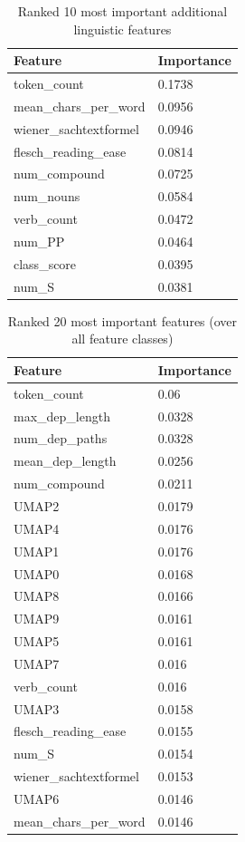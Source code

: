 \documentclass[11pt]{article}
\begin{document}
\begin{table}[ht]
    \centering\small
\begin{tabular}{ll}
\hline
Feature & Importance \\ 
\hline
token\_count & 0.1738 \\
mean\_chars\_per\_word & 0.0956 \\
wiener\_sachtextformel & 0.0946 \\
flesch\_reading\_ease & 0.0814 \\
num\_compound & 0.0725 \\
num\_nouns & 0.0584 \\
verb\_count & 0.0472 \\
num\_PP & 0.0464 \\
class\_score & 0.0395 \\
num\_S & 0.0381 \\
\hline
\end{tabular} 
\caption{Ranked 10 most important additional linguistic features}
    \label{tab:importanceAdditional}
\end{table}

\begin{table}[ht]
    \centering\small
\begin{tabular}{ll}
\hline
Feature & Importance \\ 
\hline
token\_count & 0.06 \\
max\_dep\_length & 0.0328 \\
num\_dep\_paths & 0.0328 \\
mean\_dep\_length & 0.0256 \\
num\_compound & 0.0211 \\
UMAP2 & 0.0179 \\
UMAP4 & 0.0176 \\
UMAP1 & 0.0176 \\
UMAP0 & 0.0168 \\
UMAP8 & 0.0166 \\
UMAP9 & 0.0161 \\
UMAP5 & 0.0161 \\
UMAP7 & 0.016 \\
verb\_count & 0.016 \\
UMAP3 & 0.0158 \\
flesch\_reading\_ease & 0.0155 \\
num\_S & 0.0154 \\
wiener\_sachtextformel & 0.0153 \\
UMAP6 & 0.0146 \\
mean\_chars\_per\_word & 0.0146 \\
\hline
\end{tabular} 
\caption{Ranked 20 most important features (over all feature classes)}
    \label{tab:importanceAll}
\end{table}
\end{document}
